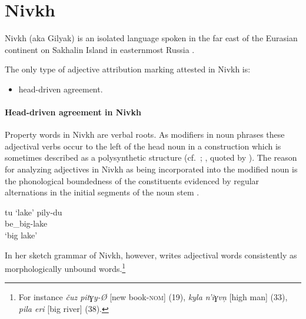 \section{Nivkh}
Nivkh (aka Gilyak) is an isolated language spoken in the far east of the Eurasian continent on Sakhalin Island in easternmost Russia \citep[222–223]{salminen2007}.

The only type of adjective attribution marking attested in Nivkh is:
\begin{itemize}
\item head\hyp{}driven agreement.
\end{itemize}

\paragraph*{Head\hyp{}driven agreement in Nivkh}
Property words in Nivkh are verbal roots. As modifiers in noun phrases these adjectival verbs occur to the left of the head noun in a construction which is sometimes described as a polysynthetic structure (cf.~\citealt[16]{gruzdeva1998}; \citealt[80]{jakobson1971}, quoted by \citealt[138]{rijkhoff2002}). The reason for analyzing adjectives in Nivkh as being incorporated into the modified noun is the phonological boundedness of the constituents evidenced by regular alternations in the initial segments of the noun stem \citep[16]{gruzdeva1998}.
\begin{exe}
\begin{xlist}
\ex tu ‘lake’
\ex 
\gll	pily-du\\
	be\_big-lake\\
\glt	‘big lake’
\end{xlist}
\end{exe}
In her sketch grammar of Nivkh, however, \citet{gruzdeva1998} writes adjectival words consistently as morphologically unbound words.\footnote{For instance \textit{čuz pitɣy-Ø} [new book-\textsc{nom}] (19), \textit{kyla n'iɣvn̦} [high man] (33), \textit{pila eri} [big river] (38).}

